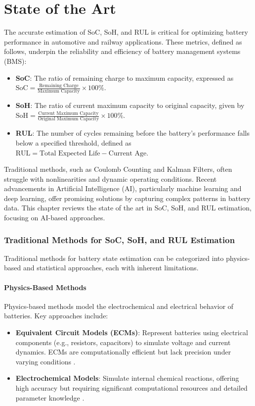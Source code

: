 \chapter{State of the Art}
\label{ch:stateoftheart}
The accurate estimation of SoC, SoH, and RUL is critical for optimizing battery performance in automotive and railway applications. These metrics, defined as follows, underpin the reliability and efficiency of battery management systems (BMS):
\begin{itemize}
    \item \textbf{SoC}: The ratio of remaining charge to maximum capacity, expressed as \( \text{SoC} = \frac{\text{Remaining Charge}}{\text{Maximum Capacity}} \times 100\% \).
    \item \textbf{SoH}: The ratio of current maximum capacity to original capacity, given by \( \text{SoH} = \frac{\text{Current Maximum Capacity}}{\text{Original Maximum Capacity}} \times 100\% \).
    \item \textbf{RUL}: The number of cycles remaining before the battery's performance falls below a specified threshold, defined as \( \text{RUL} = \text{Total Expected Life} - \text{Current Age} \).
\end{itemize}
Traditional methods, such as Coulomb Counting and Kalman Filters, often struggle with nonlinearities and dynamic operating conditions. Recent advancements in Artificial Intelligence (AI), particularly machine learning and deep learning, offer promising solutions by capturing complex patterns in battery data. This chapter reviews the state of the art in SoC, SoH, and RUL estimation, focusing on AI-based approaches.

\subsection{Traditional Methods for SoC, SoH, and RUL Estimation}
Traditional methods for battery state estimation can be categorized into physics-based and statistical approaches, each with inherent limitations.

\subsubsection{Physics-Based Methods}
Physics-based methods model the electrochemical and electrical behavior of batteries. Key approaches include:
\begin{itemize}
    \item \textbf{Equivalent Circuit Models (ECMs)}: Represent batteries using electrical components (e.g., resistors, capacitors) to simulate voltage and current dynamics. ECMs are computationally efficient but lack precision under varying conditions \cite{Ref5}.
    \item \textbf{Electrochemical Models}: Simulate internal chemical reactions, offering high accuracy but requiring significant computational resources and detailed parameter knowledge \cite{Ref5}.
\end{itemize}

